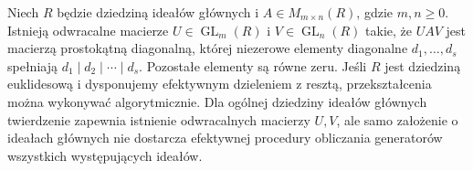 \begin{twierdzenie}
\label{aa:tw:smith-normal-form}
Niech $R$ będzie dziedziną ideałów głównych i
$A\in M_{m\times n}(R)$, gdzie $m,n\ge0$.
Istnieją odwracalne macierze $U\in\operatorname{GL}_m(R)$
i $V\in\operatorname{GL}_n(R)$ takie, że $UAV$ jest macierzą
prostokątną diagonalną, której niezerowe elementy diagonalne
$d_1,\dots,d_s$ spełniają
$d_1\mid d_2\mid\cdots\mid d_s$.
Pozostałe elementy są równe zeru. Jeśli $R$ jest dziedziną
euklidesową i dysponujemy efektywnym dzieleniem z resztą,
przekształcenia można wykonywać algorytmicznie.
Dla ogólnej dziedziny
ideałów głównych twierdzenie zapewnia istnienie
odwracalnych macierzy $U,V$, ale samo założenie o
ideałach głównych nie dostarcza efektywnej procedury
obliczania generatorów wszystkich występujących ideałów.
\end{twierdzenie}
